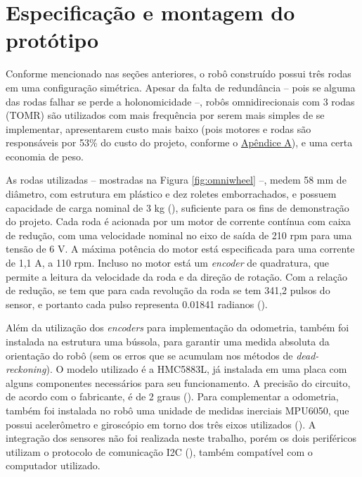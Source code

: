 

\section{Especificação e montagem do protótipo}
\label{sec:montagem}

Conforme mencionado nas seções anteriores, o robô construído possui três rodas em uma configuração simétrica. Apesar da falta de redundância -- pois se alguma das rodas falhar se perde a holonomicidade --, robôs omnidirecionais com 3 rodas (TOMR) são utilizados com mais frequência por serem mais simples de se implementar, apresentarem custo mais baixo (pois motores e rodas são responsáveis por 53\% do custo do projeto, conforme o \hyperref[sec:custo]{Apêndice A}), e uma certa economia de peso.

As rodas utilizadas -- mostradas na Figura \ref{fig:omniwheel} --, medem 58 mm de diâmetro, com estrutura em plástico e dez roletes emborrachados, e possuem capacidade de carga nominal de 3 kg (\cite{omniwheel}), suficiente para os fins de demonstração do projeto. Cada roda é acionada por um motor de corrente contínua com caixa de redução, com uma velocidade nominal no eixo de saída de 210 rpm para uma tensão de 6 V. A máxima potência do motor está especificada para uma corrente de 1,1 A, a 110 rpm. Incluso no motor está um \textit{encoder} de quadratura, que permite a leitura da velocidade da roda e da direção de rotação. Com a relação de redução, se tem que para cada revolução da roda se tem 341,2 pulsos do sensor, e portanto cada pulso representa 0.01841 radianos (\cite{motor}).

Além da utilização dos \textit{encoders} para implementação da odometria, também foi instalada na estrutura uma bússola, para garantir uma medida absoluta da orientação do robô (sem os erros que se acumulam nos métodos de \textit{dead-reckoning}). O modelo utilizado é a HMC5883L, já instalada em uma placa com alguns componentes necessários para seu funcionamento. A precisão do circuito, de acordo com o fabricante, é de 2 graus (\cite{HMC5883L}). Para complementar a odometria, também foi instalada no robô uma unidade de medidas inerciais MPU6050, que possui acelerômetro e giroscópio em torno dos três eixos utilizados (\cite{MPU6050}). A integração dos sensores não foi realizada neste trabalho, porém os dois periféricos utilizam o protocolo de comunicação I2C (\cite{semiconductors2000i2c}), também compatível com o computador utilizado.

